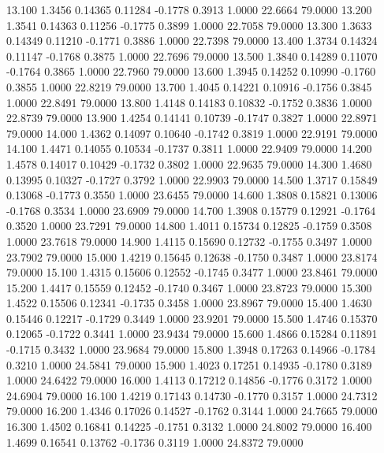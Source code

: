  13.100   1.3456   0.14365   0.11284  -0.1778   0.3913   1.0000  22.6664  79.0000
  13.200   1.3541   0.14363   0.11256  -0.1775   0.3899   1.0000  22.7058  79.0000
  13.300   1.3633   0.14349   0.11210  -0.1771   0.3886   1.0000  22.7398  79.0000
  13.400   1.3734   0.14324   0.11147  -0.1768   0.3875   1.0000  22.7696  79.0000
  13.500   1.3840   0.14289   0.11070  -0.1764   0.3865   1.0000  22.7960  79.0000
  13.600   1.3945   0.14252   0.10990  -0.1760   0.3855   1.0000  22.8219  79.0000
  13.700   1.4045   0.14221   0.10916  -0.1756   0.3845   1.0000  22.8491  79.0000
  13.800   1.4148   0.14183   0.10832  -0.1752   0.3836   1.0000  22.8739  79.0000
  13.900   1.4254   0.14141   0.10739  -0.1747   0.3827   1.0000  22.8971  79.0000
  14.000   1.4362   0.14097   0.10640  -0.1742   0.3819   1.0000  22.9191  79.0000
  14.100   1.4471   0.14055   0.10534  -0.1737   0.3811   1.0000  22.9409  79.0000
  14.200   1.4578   0.14017   0.10429  -0.1732   0.3802   1.0000  22.9635  79.0000
  14.300   1.4680   0.13995   0.10327  -0.1727   0.3792   1.0000  22.9903  79.0000
  14.500   1.3717   0.15849   0.13068  -0.1773   0.3550   1.0000  23.6455  79.0000
  14.600   1.3808   0.15821   0.13006  -0.1768   0.3534   1.0000  23.6909  79.0000
  14.700   1.3908   0.15779   0.12921  -0.1764   0.3520   1.0000  23.7291  79.0000
  14.800   1.4011   0.15734   0.12825  -0.1759   0.3508   1.0000  23.7618  79.0000
  14.900   1.4115   0.15690   0.12732  -0.1755   0.3497   1.0000  23.7902  79.0000
  15.000   1.4219   0.15645   0.12638  -0.1750   0.3487   1.0000  23.8174  79.0000
  15.100   1.4315   0.15606   0.12552  -0.1745   0.3477   1.0000  23.8461  79.0000
  15.200   1.4417   0.15559   0.12452  -0.1740   0.3467   1.0000  23.8723  79.0000
  15.300   1.4522   0.15506   0.12341  -0.1735   0.3458   1.0000  23.8967  79.0000
  15.400   1.4630   0.15446   0.12217  -0.1729   0.3449   1.0000  23.9201  79.0000
  15.500   1.4746   0.15370   0.12065  -0.1722   0.3441   1.0000  23.9434  79.0000
  15.600   1.4866   0.15284   0.11891  -0.1715   0.3432   1.0000  23.9684  79.0000
  15.800   1.3948   0.17263   0.14966  -0.1784   0.3210   1.0000  24.5841  79.0000
  15.900   1.4023   0.17251   0.14935  -0.1780   0.3189   1.0000  24.6422  79.0000
  16.000   1.4113   0.17212   0.14856  -0.1776   0.3172   1.0000  24.6904  79.0000
  16.100   1.4219   0.17143   0.14730  -0.1770   0.3157   1.0000  24.7312  79.0000
  16.200   1.4346   0.17026   0.14527  -0.1762   0.3144   1.0000  24.7665  79.0000
  16.300   1.4502   0.16841   0.14225  -0.1751   0.3132   1.0000  24.8002  79.0000
  16.400   1.4699   0.16541   0.13762  -0.1736   0.3119   1.0000  24.8372  79.0000
